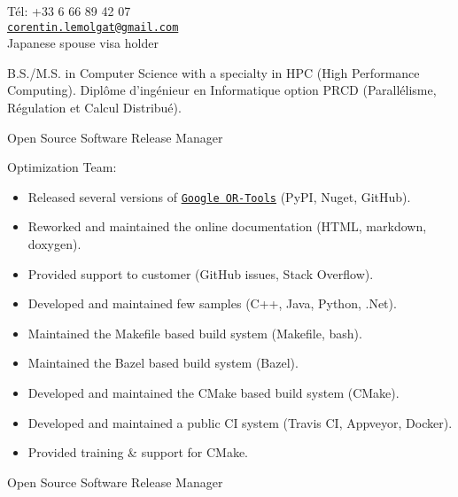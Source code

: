 \documentclass{article}
\begin{document}


T\'{e}l: +33 6 66 89 42 07\\
\href{mailto:corentin.lemolgat@gmail.com}{\texttt{corentin.lemolgat@gmail.com}}\\
 {
Japanese spouse visa holder\\
} {
}

\begin{llist}

 
 {
B.S./M.S. in Computer Science with a specialty in HPC (High Performance Computing).
} {
Dipl\^{o}me d'ing\'{e}nieur en Informatique option PRCD (Parall\'{e}lisme,
R\'{e}gulation et Calcul Distribu\'{e}).
}

 {
} {
}
\vspace{-0.33cm}

 {
} {
}
 {
Open Source Software Release Manager\\
\vspace{-0.33cm}

Optimization Team:
\vspace{-0.33cm}
\begin{itemize}
	\item Released several versions of \href{https://github.com/google/or-tools}{\texttt{Google OR-Tools}} (PyPI, Nuget, GitHub).
	\item Reworked and maintained the online documentation (HTML, markdown, doxygen).
	\item Provided support to customer (GitHub issues, Stack Overflow).
	\item Developed and maintained few samples (C++, Java, Python, .Net).
	\item Maintained the Makefile based build system (Makefile, bash).
	\item Maintained the Bazel based build system (Bazel).
	\item Developed and maintained the CMake based build system (CMake).
	\item Developed and maintained a public CI system (Travis CI, Appveyor, Docker).
	\item Provided training \& support for CMake.
\end{itemize}
} {
Open Source Software Release Manager\\
\vspace{-0.33cm}

}
\end{llist}
\end{document}
